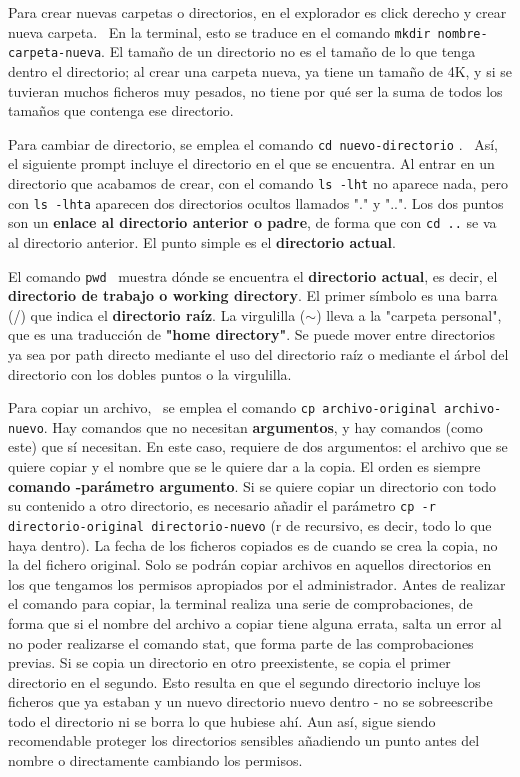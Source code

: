 Para crear nuevas carpetas o directorios, en el explorador es click derecho y crear nueva carpeta.  \ En la terminal, esto se traduce en el comando \texttt{mkdir nombre-carpeta-nueva}. El tamaño de un directorio no es el tamaño de lo que tenga dentro el directorio; al crear una carpeta nueva, ya tiene un tamaño de 4K, y si se tuvieran muchos ficheros muy pesados, no tiene por qué ser la suma de todos los tamaños que contenga ese directorio.

Para cambiar de directorio, se emplea el comando \texttt{cd nuevo-directorio} \marginpar[\footnotesize cd]. \ Así, el siguiente prompt incluye el directorio en el que se encuentra. Al entrar en un directorio que acabamos de crear, con el comando \texttt{ls -lht} no aparece nada, pero con \texttt{ls -lhta} aparecen dos directorios ocultos llamados "." y "..". Los dos puntos son un\textbf{ enlace al directorio anterior o padre}, de forma que con \texttt{cd ..} se va al directorio anterior. El punto simple es el \textbf{directorio actual}. 

El comando \texttt{pwd}  \ muestra dónde se encuentra el \textbf{directorio actual}, es decir, el \textbf{directorio de trabajo o working directory}. El primer símbolo es una barra (/) que indica el \textbf{directorio raíz}. La virgulilla ($\sim$) lleva a la "carpeta personal", que es una traducción de \textbf{"home directory"}. Se puede mover entre directorios ya sea por path directo mediante el uso del directorio raíz o mediante el árbol del directorio con los dobles puntos o la virgulilla. 

Para copiar un archivo,  \marginpar[\footnotesize cp] \ se emplea el comando \texttt{cp archivo-original archivo-nuevo}. Hay comandos que no necesitan \textbf{argumentos}, y hay comandos (como este) que sí necesitan. En este caso, requiere de dos argumentos: el archivo que se quiere copiar y el nombre que se le quiere dar a la copia. El orden es siempre \textbf{comando -parámetro argumento}. Si se quiere copiar un directorio con todo su contenido a otro directorio, es necesario añadir el parámetro \texttt{cp -r directorio-original directorio-nuevo} (r de recursivo, es decir, todo lo que haya dentro). La fecha de los ficheros copiados es de cuando se crea la copia, no la del fichero original. Solo se podrán copiar archivos en aquellos directorios en los que tengamos los permisos apropiados por el administrador. Antes de realizar el comando para copiar, la terminal realiza una serie de comprobaciones, de forma que si el nombre del archivo a copiar tiene alguna errata, salta un error al no poder realizarse el comando stat, que forma parte de las comprobaciones previas. Si se copia un directorio en otro preexistente, se copia el primer directorio en el segundo. Esto resulta en que el segundo directorio incluye los ficheros que ya estaban y un nuevo directorio nuevo dentro - no se sobreescribe todo el directorio ni se borra lo que hubiese ahí. Aun así, sigue siendo recomendable proteger los directorios sensibles añadiendo un punto antes del nombre o directamente cambiando los permisos.

